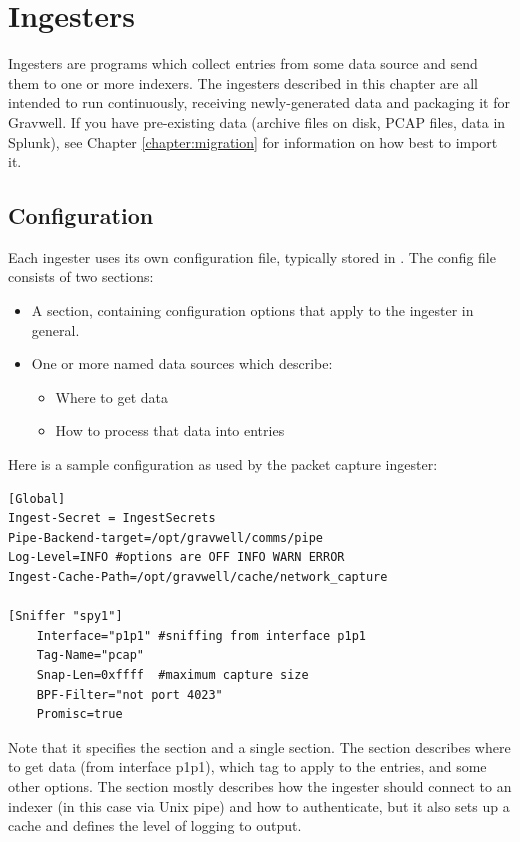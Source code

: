 \chapter{Ingesters}
Ingesters are programs which collect entries from some data source and
send them to one or more indexers. The ingesters described in this chapter
are all intended to run continuously, receiving newly-generated data
and packaging it for Gravwell. If you have pre-existing data (archive
files on disk, PCAP files, data in Splunk), see Chapter \ref{chapter:migration}
for information on how best to import it.

\section{Configuration}
\label{sec:global-config}

Each ingester uses its own configuration file, typically stored in
. The config file consists of two sections:

\begin{itemize}
\item
  A \code{[Global]} section, containing configuration options that
  apply to the ingester in general.
\item
  One or more named data sources which describe:
	\begin{itemize}
	\item Where to get data
	\item How to process that data into entries
	\end{itemize}
\end{itemize}

Here is a sample configuration as used by the packet capture ingester:

\begin{Verbatim}[breaklines=true]
[Global]
Ingest-Secret = IngestSecrets
Pipe-Backend-target=/opt/gravwell/comms/pipe
Log-Level=INFO #options are OFF INFO WARN ERROR
Ingest-Cache-Path=/opt/gravwell/cache/network_capture

[Sniffer "spy1"]
    Interface="p1p1" #sniffing from interface p1p1
    Tag-Name="pcap"
    Snap-Len=0xffff  #maximum capture size
    BPF-Filter="not port 4023"
    Promisc=true
\end{Verbatim}

Note that it specifies the \code{[Global]} section and a single
\code{[Sniffer]} section. The \code{[Sniffer]} section describes where to get
data (from interface p1p1), which tag to apply to the entries, and some
other options. The \code{[Global]} section mostly describes how the
ingester should connect to an indexer (in this case via Unix pipe) and
how to authenticate, but it also sets up a cache and defines the level
of logging to output.

